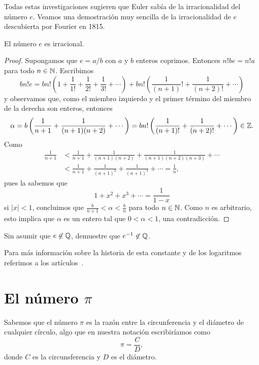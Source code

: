Todas estas investigaciones sugieren que Euler sabía de la irracionalidad del
número $e$. Veamos una demostración muy sencilla de la irracionalidad de $e$
descubierta por Fourier en 1815. 

\begin{theorem}
	El número $e$ es irracional.	
\end{theorem}

\begin{proof}
	Supongamos que $e=a/b$ con $a$ y $b$ enteros coprimos. Entonces $n!be=n!a$
	para todo $n\in\mathbb{N}$. Escribimos
	\[
		bn!e=bn!\left(1+\frac{1}{1!}+\frac{1}{2!}+\frac{1}{3!}+\cdots\right)+bn!\left(\frac{1}{(n+1)}!+\frac{1}{(n+2)!}+\cdots\right)
	\]
	y observamos que, como el miembro izquierdo y el primer término del miembro
	de la derecha son enteros, entonces 
	\[
		\alpha=b\left(\frac{1}{n+1}+\frac{1}{(n+1)(n+2)}+\cdots\right)=bn!\left(\frac{1}{(n+1)!}+\frac{1}{(n+2)!}+\cdots\right)\in\mathbb{Z}.
	\]
	Como 
	\begin{align*}
		\frac{1}{n+1}&<\frac{1}{n+1}+\frac1{(n+1)(n+2)}+\frac{1}{(n+1)(n+2)(n+3)}+\cdots\\
		&<\frac{1}{n+1}+\frac{1}{(n+1)^2}+\frac{1}{(n+1)^3}+\cdots
		=\frac{1}{n},
	\end{align*}
	pues la sabemos que 
	\[
		1+x^2+x^3+\cdots=\frac{1}{1-x}
	\]
	si $|x|<1$, concluimos que 
	$\frac{b}{n+1}<\alpha<\frac{b}{n}$ para todo $n\in\mathbb{N}$. Como $n$ es
	arbitrario, esto implica que $\alpha$ es un entero tal que $0<\alpha<1$,
	una contradicción.
\end{proof}

\begin{exercise}
	Sin asumir que $e\not\in\mathbb{Q}$, 
	demuestre que $e^{-1}\not\in\mathbb{Q}$.
\end{exercise}

Para más información sobre la historia de esta constante y de los logaritmos
referimos a los
artículos~\cite{MR1517859,MR1517841,MR1517806,MR1517796,MR1517770,MR1517761}.

\section*{El número $\pi$}

Sabemos que el número $\pi$ es la razón entre la circunferencia y el diámetro
de cualquier círculo, algo que en nuestra notación escribiríamos como
\[
	\pi=\frac{C}{D},
\]
donde $C$ es la circunsferencia y $D$ es el diámetro. 

